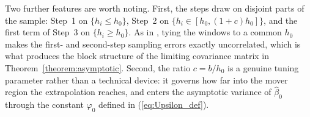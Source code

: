 \documentclass{article}
\newtheorem{condition}{Condition}
\newcommand{\normm}[1]{\lVert#1\rVert}
\newcommand{\E}{\mathbb{E}}
\newcommand{\R}{\mathbb{R}}
\begin{document}
Two further features are worth noting. First, the steps draw on disjoint parts of the sample: Step~1 on $\{h_i\le h_0\}$, Step~2 on $\{h_i\in[h_0,(1+c)h_0]\}$, and the first term of Step~3 on $\{h_i\ge h_0\}$. As in \cite{grahampowell}, tying the windows to a common $h_0$ makes the first- and second-step sampling errors exactly uncorrelated, which is what produces the block structure of the limiting covariance matrix in Theorem~\ref{theorem:asymptotic}. Second, the ratio $c=b/h_0$ is a genuine tuning parameter rather than a technical device: it governs how far into the mover region the extrapolation reaches, and enters the asymptotic variance of $\hat\beta_0$ through the constant $\varphi_0$ defined in (\ref{eq:Upsilon_def}).

\end{document}

